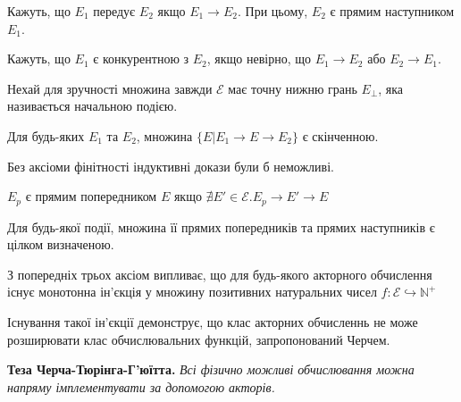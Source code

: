 \documentclass[12pt]{article}
\begin{document}
\begin{definition}[Передування]
Кажуть, що $E_1$  передує $E_2$ якщо $E_1 \longrightarrow E_2$.
При цьому, $E_2$ є прямим наступником $E_1$.
\end{definition}

\begin{definition}[Конкурентність]
Кажуть, що $E_1$ є конкурентною з $E_2$, якщо невірно, що $E_1 \longrightarrow E_2$ або $E_2 \longrightarrow E_1$.
\end{definition}

\begin{axiom}
Нехай для зручності множина завжди $\mathcal{E}$ має точну нижню грань $E_{\bot}$, яка називається начальною подією.
\end{axiom}

\begin{axiom}[Фінітність]
Для будь-яких $E_1$ та $E_2$, множина $\{E | E_1 \longrightarrow E \longrightarrow E_2\}$ є скінченною.
\end{axiom}

Без аксіоми фінітності індуктивні докази були б неможливі.

\begin{definition}
$E_p$ є прямим попередником $E$ якщо $\nexists E'\in\mathcal{E}. E_p \longrightarrow E' \longrightarrow E$
\end{definition}

\begin{axiom}[Дискретність]
Для будь-якої події, множина її прямих попередників та прямих наступників є цілком визначеною.
\end{axiom}

\begin{corollary}
З попередніх трьох аксіом випливає, що для будь-якого акторного обчислення існує монотонна ін'єкція у множину позитивних натуральних чисел $f: \mathcal{E} \hookrightarrow \mathbb{N}^{+}$
\end{corollary}

Існування такої ін'єкції демонструє, що клас акторних обчисленнь не може розширювати клас обчислювальних функцій, запропонований Черчем.\\

\begin{displayquote}
\textbf{Теза Черча-Тюрінга-Г'юїтта.} \textit{Всі фізично можливі обчислювання можна напряму імплементувати за допомогою акторів.}\\
\end{displayquote}
\end{document}

